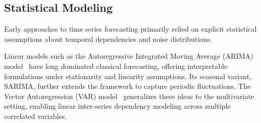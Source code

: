 


\subsection{Statistical Modeling}
Early approaches to time series forecasting primarily relied on explicit statistical assumptions about temporal dependencies and noise distributions.

Linear models such as the Autoregressive Integrated Moving Average (ARIMA) model~\cite{2013ARIMA} have long dominated classical forecasting, offering interpretable formulations under stationarity and linearity assumptions. Its seasonal variant, SARIMA, further extends the framework to capture periodic fluctuations. The Vector Autoregression (VAR) model~\cite{Zivot2003} generalizes these ideas to the multivariate setting, enabling linear inter-series dependency modeling across multiple correlated variables.

